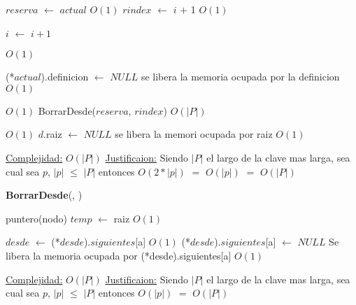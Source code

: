 \begin{Algoritmos}
\begin{algorithm}[H]
\begin{algorithmic}[1]
	\State $reserva$ $\gets$ $actual$ \Comment $O(1)$
	\State $rindex$ $\gets$ $i$ $+$ 1 \Comment $O(1)$
	
	\EndIf

	\State $i$ $\gets$ $i + 1$
\EndWhile 


 \Comment $O(1)$

	\State (*$actual$).definicion $\gets$ $NULL$ \Comment se libera la memoria ocupada por la definicion $O(1)$

\EndIf 

 \Comment $O(1)$
	\State BorrarDesde($reserva$, $rindex$) \Comment $O(|P|)$
\EndIf 


 \Comment $O(1)$
	\State $d$.raiz $\gets$ $NULL$ \Comment se libera la memori ocupada por raiz $O(1)$
\EndIf 





\medskip
\State \underline{Complejidad:} $O(|P|)$
\State \underline{Justificaion:} Siendo $|P|$ el largo de la clave mas larga, sea cual sea $p$, $|p|$ $\leq$ $|P|$ entonces $O(2*|p|)$ $=$	$O(|p|)$ $=$ $O(|P|)$

\end{algorithmic}
\end{algorithm}
  
\begin{algorithm}[H]
{\textbf{BorrarDesde}(}, )
\begin{algorithmic}[1]

\State puntero(nodo) $temp$ $\gets$ raiz \Comment $O(1)$

\State $desde$ $\gets$ (*$desde$).$siguientes$[a] \Comment $O(1)$
\State (*$desde$).$siguientes$[a] $\gets$ $NULL$ \Comment Se libera la memoria ocupada por (*desde).siguientes[a] $O(1)$




\medskip
\State \underline{Complejidad:} $O(|P|)$
\State \underline{Justificaion:} Siendo $|P|$ el largo de la clave mas larga, sea cual sea $p$, $|p|$ $\leq$ $|P|$ entonces 	$O(|p|)$ $=$ $O(|P|)$

\end{algorithmic}
\end{algorithm}
  
  
  
\end{Algoritmos}


